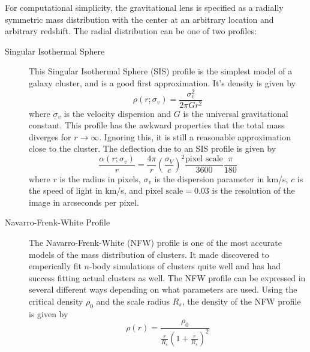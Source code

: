 \documentclass[10pt,twoside]{article}
\theoremstyle{definition}
\theoremstyle{exercise}
\begin{document}
For computational simplicity, the gravitational lens is specified as a radially symmetric mass distribution with the center at an arbitrary location and arbitrary redshift. The radial distribution can be one of two profiles:
\begin{description}
  \item[Singular Isothermal Sphere] This Singular Isothermal Sphere (SIS) profile is the simplest model of a galaxy cluster, and is a good first approximation. It's density is given by
    \begin{equation}
      \rho(r; \sigma_v) = \frac{\sigma_v^2}{2\pi Gr^2}
      \label{eq:SIS_density}
    \end{equation}
    where $\sigma_v$ is the velocity dispersion and $G$ is the universal gravitational constant. This profile has the awkward properties that the total mass diverges for $r \to \infty$. Ignoring this, it is still a reasonable approximation close to the cluster. The deflection due to an SIS profile is given by 
    \begin{equation}
      \frac{\alpha(r; \sigma_v)}{r} = \frac{4\pi}{r}\left( \frac{\sigma_V}{c} \right)^2 \frac{\text{pixel scale}}{3600}\frac{\pi}{180}
      \label{eq:SIS_deflection}
    \end{equation}
    where $r$ is the radius in pixels, $\sigma_v$ is the dispersion parameter in km/s, $c$ is the speed of light in km/s, and $\text{pixel scale} = 0.03$ is the resolution of the image in arcseconds per pixel.

  \item[Navarro-Frenk-White Profile] The Navarro-Frenk-White (NFW) profile is one of the most accurate models of the mass distribution of clusters. It made discovered to emperically fit $n$-body simulations of clusters quite well and has had success fitting actual clusters as well.
    The NFW profile can be expressed in several different ways depending on what parameters are used. Using the critical density $\rho_0$ and the scale radius $R_s$, the density of the NFW profile is given by
    \begin{equation}
      \rho(r) = \frac{\rho_0}{\frac{r}{R_s}\left( 1+\frac{r}{R_s} \right)^2}
      \label{eq:NFW_density}
    \end{equation}


\end{description}
\end{document}
